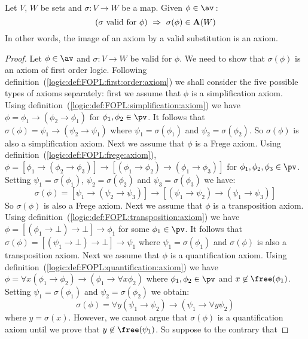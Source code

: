 \begin{lemma}\label{logic:lemma:FUAP:substitution:axiom}
Let $V$, $W$ be sets and $\sigma:V\to W$ be a map. Given
$\phi\in\av$\,:
    \[
    (\mbox{$\sigma$ valid for $\phi$})\ \Rightarrow\
    \sigma(\phi)\in{\bf A}(W)
    \]
In other words, the image of an axiom by a valid substitution is an
axiom.
\end{lemma}
\begin{proof}
Let $\phi\in\av$ and $\sigma:V\to W$ be valid for $\phi$. We need to
show that $\sigma(\phi)$ is an axiom of first order logic. Following
definition~(\ref{logic:def:FOPL:first:order:axiom}) we shall
consider the five possible types of axioms separately: first we
assume that $\phi$ is a simplification axiom. Using
definition~(\ref{logic:def:FOPL:simplification:axiom}) we have $\phi
= \phi_{1}\to(\phi_{2}\to\phi_{1})$ for $\phi_{1},\phi_{2}\in\pv$.
It follows that $\sigma(\phi)=\psi_{1}\to(\psi_{2}\to\psi_{1})$
where $\psi_{1}=\sigma(\phi_{1})$ and $\psi_{2}=\sigma(\phi_{2})$.
So $\sigma(\phi)$ is also a simplification axiom. Next we assume
that $\phi$ is a Frege axiom. Using
definition~(\ref{logic:def:FOPL:frege:axiom}), $ \phi =
    [\phi_{1}\to(\phi_{2}\to\phi_{3})]\to[(\phi_{1}\to\phi_{2})\to(\phi_{1}\to\phi_{3})]$
for $\phi_{1},\phi_{2},\phi_{3}\in\pv$. Setting
$\psi_{1}=\sigma(\phi_{1})$, $\psi_{2}=\sigma(\phi_{2})$ and
$\psi_{3}=\sigma(\phi_{3})$ we have:
    \[
    \sigma(\phi) =
    [\psi_{1}\to(\psi_{2}\to\psi_{3})]\to[(\psi_{1}\to\psi_{2})\to(\psi_{1}\to\psi_{3})]
    \]
So $\sigma(\phi)$ is also a Frege axiom. Next we assume that $\phi$
is a transposition axiom. Using
definition~(\ref{logic:def:FOPL:transposition:axiom}) we have $\phi
=[(\phi_{1}\to\bot)\to\bot]\to\phi_{1}$ for some $\phi_{1}\in\pv$.
It follows that $\sigma(\phi)
=[(\psi_{1}\to\bot)\to\bot]\to\psi_{1}$ where
$\psi_{1}=\sigma(\phi_{1})$ and $\sigma(\phi)$ is also a
transposition axiom. Next we assume that $\phi$ is a quantification
axiom. Using definition~(\ref{logic:def:FOPL:quantification:axiom})
we have $\phi =\forall x(\phi_{1}\to\phi_{2})\to(\phi_{1} \to\forall
x \phi_{2})$ where $\phi_{1},\phi_{2}\in\pv$ and
$x\not\in\free(\phi_{1})$. Setting $\psi_{1}=\sigma(\phi_{1})$ and
$\psi_{2}=\sigma(\phi_{2})$ we obtain:
    \[
    \sigma(\phi) =\forall y(\psi_{1}\to\psi_{2})\to(\psi_{1} \to\forall
    y \psi_{2})
    \]
where $y=\sigma(x)$. However, we cannot argue that $\sigma(\phi)$ is
a quantification axiom until we prove that
$y\not\in\free(\psi_{1})$. So suppose to the contrary that

\end{proof}
